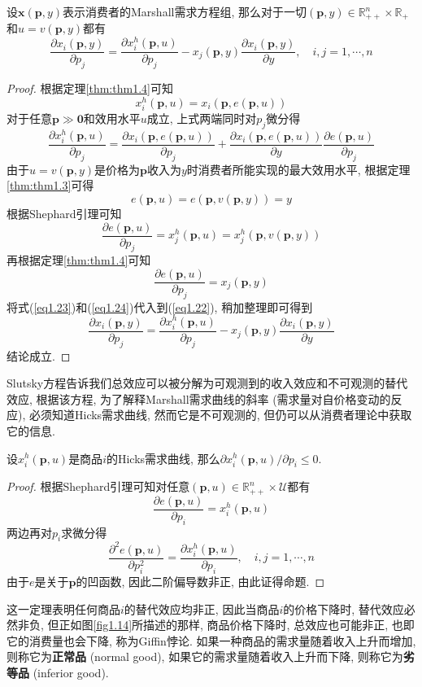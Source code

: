 \documentclass[cn, 12pt, math=mtpro2, bibstyle=apa, blue, twocol]{elegantbook}
\newcommand{\R}{\mathbb{R}}
\newcommand{\p}{\mathbf{p}}
\newcommand{\x}{\mathbf{x}}
\begin{document}
\begin{theorem}[Slutsky方程]
  设$\x(\p,y)$表示消费者的Marshall需求方程组, 那么对于一切$(\p,y)\in\R_{++}^n\times\R_+$和$u=v(\p,y)$都有
  $$\frac{\partial x_i(\p,y)}{\partial p_j}=\frac{\partial x_i^h(\p,u)}{\partial p_j}-x_j(\p,y)\frac{\partial x_i(\p,y)}{\partial y},\quad i,j=1,\cdots,n$$
\end{theorem}
\begin{proof}
  根据定理\ref{thm:thm1.4}可知
  $$x_i^h(\p,u)=x_i(\p,e(\p,u))$$
  对于任意$\p\gg\mathbf{0}$和效用水平$u$成立, 上式两端同时对$p_j$微分得
  \begin{equation}\label{eq1.22}
    \frac{\partial x_i^h(\p,u)}{\partial p_j}=\frac{\partial x_i(\p,e(\p,u))}{\partial p_j}+\frac{\partial x_i(\p,e(\p,u))}{\partial y}\frac{\partial e(\p,u)}{\partial p_j}
  \end{equation}
  由于$u=v(\p,y)$是价格为$\p$收入为$y$时消费者所能实现的最大效用水平, 根据定理\ref{thm:thm1.3}可得
  \begin{equation}\label{eq1.23}
    e(\p,u)=e(\p,v(\p,y))=y
  \end{equation}
  根据Shephard引理可知
  $$\frac{\partial e(\p,u)}{\partial p_j}=x_j^h(\p,u)=x_j^h(\p,v(\p,y))$$
  再根据定理\ref{thm:thm1.4}可知
  \begin{equation}\label{eq1.24}
    \frac{\partial e(\p,u)}{\partial p_j}=x_j(\p,y)
  \end{equation}
  将式(\ref{eq1.23})和(\ref{eq1.24})代入到(\ref{eq1.22}), 稍加整理即可得到
  $$\frac{\partial x_i(\p,y)}{\partial p_j}=\frac{\partial x_i^h(\p,u)}{\partial p_j}-x_j(\p,y)\frac{\partial x_i(\p,y)}{\partial y}$$
  结论成立.
\end{proof}

Slutsky方程告诉我们总效应可以被分解为可观测到的收入效应和不可观测的替代效应, 根据该方程, 为了解释Marshall需求曲线的斜率 (需求量对自价格变动的反应), 必须知道Hicks需求曲线, 然而它是不可观测的, 但仍可以从消费者理论中获取它的信息.

\begin{theorem}
  设$x_i^h(\p,u)$是商品$i$的Hicks需求曲线, 那么$\partial x_i^h(\p,u)/\partial p_i\le0$.
\end{theorem}
\begin{proof}
  根据Shephard引理可知对任意$(\p,u)\in\R_{++}^n\times\mathcal{U}$都有
  $$\frac{\partial e(\p,u)}{\partial p_i}=x_i^h(\p,u)$$
  两边再对$p_i$求微分得
  $$\frac{\partial^2e(\p,u)}{\partial p_i^2}=\frac{\partial x_i^h(\p,u)}{\partial p_i},\quad i,j=1,\cdots,n$$
  由于$e$是关于$\p$的凹函数, 因此二阶偏导数非正, 由此证得命题.
\end{proof}
这一定理表明任何商品$i$的替代效应均非正, 因此当商品$i$的价格下降时, 替代效应必然非负, 但正如图\ref{fig1.14}所描述的那样, 商品价格下降时, 总效应也可能非正, 也即它的消费量也会下降, 称为Giffin悖论. 如果一种商品的需求量随着收入上升而增加, 则称它为\textbf{正常品} (normal good), 如果它的需求量随着收入上升而下降, 则称它为\textbf{劣等品} (inferior good).
\end{document}
